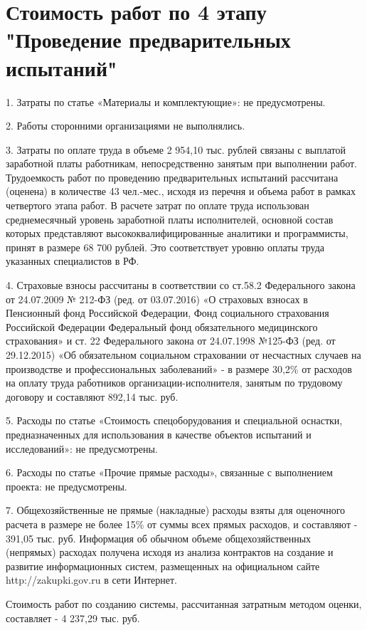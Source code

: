 \section*{Стоимость работ по 4 этапу "Проведение предварительных испытаний"}


1.	Затраты по статье «Материалы и комплектующие»:	не предусмотрены.

2. Работы сторонними организациями не выполнялись.

3. Затраты по оплате труда в объеме 2 954,10 тыс. рублей связаны с выплатой заработной платы работникам, непосредственно занятым при выполнении работ. Трудоемкость работ по проведению предварительных испытаний рассчитана (оценена) в количестве 43 чел.-мес., исходя из перечня и объема работ в рамках четвертого этапа работ. В расчете затрат по оплате труда использован среднемесячный уровень заработной платы исполнителей, основной состав которых представляют высококвалифицированные аналитики и программисты, принят в размере 68 700 рублей. Это соответствует уровню оплаты труда указанных специалистов в РФ.

4. Страховые взносы рассчитаны в соответствии со ст.58.2 Федерального закона от 24.07.2009 № 212-ФЗ (ред. от 03.07.2016) «О страховых взносах в Пенсионный фонд Российской Федерации, Фонд социального страхования Российской Федерации Федеральный фонд обязательного медицинского страхования» и ст. 22 Федерального закона от 24.07.1998 №125-ФЗ (ред. от 29.12.2015)	«Об обязательном социальном страховании от несчастных случаев на производстве и профессиональных заболеваний» - в размере 30,2\% от расходов на оплату труда работников организации-исполнителя, занятым по трудовому договору и составляют 892,14 тыс. руб.

5.	Расходы по статье «Стоимость спецоборудования и специальной оснастки, предназначенных для использования в качестве объектов испытаний и исследований»: не предусмотрены.

6.	Расходы по статье «Прочие прямые расходы», связанные с выполнением проекта: не предусмотрены.

7.	Общехозяйственные не прямые (накладные) расходы взяты для оценочного расчета в размере не более 15\% от суммы всех прямых расходов, и составляют - 391,05 тыс. руб. Информация об обычном объеме общехозяйственных (непрямых) расходах получена исходя из анализа контрактов на создание и развитие информационных систем, размещенных на официальном сайте http://zakupki.gov.ru в сети Интернет.

Стоимость работ по созданию системы, рассчитанная затратным методом оценки, составляет - 4 237,29 тыс. руб.

